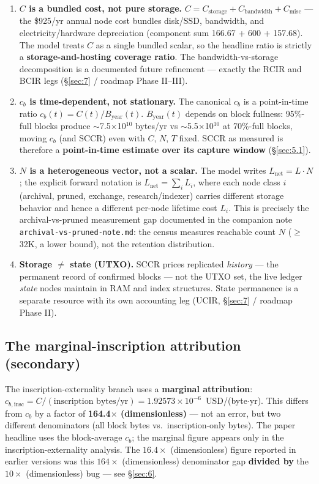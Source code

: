 \documentclass[11pt]{article}
\begin{document}
\begin{enumerate}[nosep]
  \item \textbf{$C$ is a bundled cost, not pure storage.} $C = C_{\mathrm{storage}} + C_{\mathrm{bandwidth}} + C_{\mathrm{misc}}$ --- the \$925/yr annual node cost bundles disk/SSD, bandwidth, and electricity/hardware depreciation (component sum 166.67 + 600 + 157.68). The model treats $C$ as a single bundled scalar, so the headline ratio is strictly a \textbf{storage-and-hosting coverage ratio}. The bandwidth-vs-storage decomposition is a documented future refinement --- exactly the RCIR and BCIR legs (\S\ref{sec:7} / roadmap Phase II--III).
  \item \textbf{$c_b$ is time-dependent, not stationary.} The canonical $c_b$ is a point-in-time ratio $c_b(t) = C(t)/B_{\mathrm{year}}(t)$. $B_{\mathrm{year}}(t)$ depends on block fullness: 95\%-full blocks produce $\sim$7.5$\times$10$^{10}$ bytes/yr vs $\sim$5.5$\times$10$^{10}$ at 70\%-full blocks, moving $c_b$ (and SCCR) even with $C$, $N$, $T$ fixed. SCCR as measured is therefore a \textbf{point-in-time estimate over its capture window} (\S\ref{sec:5.1}).
  \item \textbf{$N$ is a heterogeneous vector, not a scalar.} The model writes $L_{\mathrm{net}} = L \cdot N$; the explicit forward notation is $L_{\mathrm{net}} = \sum_i L_i$, where each node class $i$ (archival, pruned, exchange, research/indexer) carries different storage behavior and hence a different per-node lifetime cost $L_i$. This is precisely the archival-vs-pruned measurement gap documented in the companion note \texttt{archival-vs-pruned-note.md}: the census measures reachable count $N$ ($\geq$32K, a lower bound), not the retention distribution.
  \item \textbf{Storage $\neq$ state (UTXO).} SCCR prices replicated \emph{history} --- the permanent record of confirmed blocks --- not the UTXO set, the live ledger \emph{state} nodes maintain in RAM and index structures. State permanence is a separate resource with its own accounting leg (UCIR, \S\ref{sec:7} / roadmap Phase II).
\end{enumerate}

\subsection{The marginal-inscription attribution (secondary)}\label{sec:4.2}
The inscription-externality branch uses a \textbf{marginal attribution}: $c_{b,\mathrm{insc}} = C / (\text{inscription bytes/yr}) = 1.92573\times10^{-6}$~USD/(byte$\cdot$yr). This differs from $c_b$ by a factor of \textbf{164.4$\times$ (dimensionless)} --- not an error, but two different denominators (all block bytes vs.\ inscription-only bytes). The paper headline uses the block-average $c_b$; the marginal figure appears only in the inscription-externality analysis. The $16.4\times$ (dimensionless) figure reported in earlier versions was this $164\times$ (dimensionless) denominator gap \textbf{divided by} the $10\times$ (dimensionless) bug --- see \S\ref{sec:6}.
\end{document}
